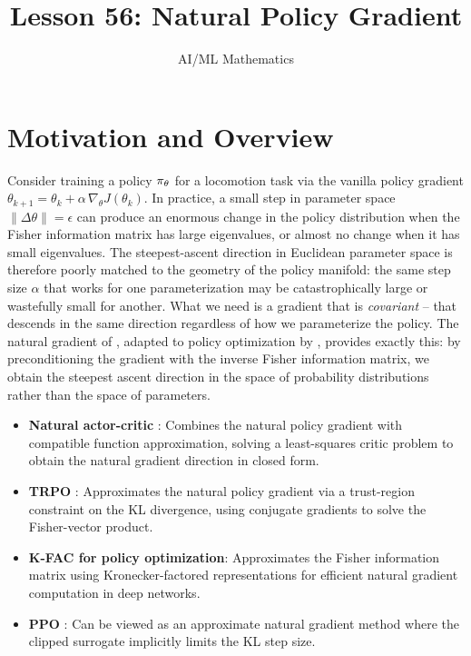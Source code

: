 \documentclass[11pt,a4paper]{article}
\title{Lesson 56: Natural Policy Gradient}
\author{AI/ML Mathematics}
\date{}
\begin{document}
\maketitle
\tableofcontents
\newpage

\section{Motivation and Overview}

Consider training a policy $\pi_\theta$ for a locomotion task via
the vanilla policy gradient $\theta_{k+1} = \theta_k + \alpha\,
\nabla_\theta J(\theta_k)$. In practice, a small step in parameter space
$\|\Delta\theta\| = \epsilon$ can produce an enormous change in the
policy distribution when the Fisher information matrix has large
eigenvalues, or almost no change when it has small eigenvalues. The
steepest-ascent direction in Euclidean parameter space is therefore
poorly matched to the geometry of the policy manifold: the same step
size $\alpha$ that works for one parameterization may be catastrophically
large or wastefully small for another. What we need is a gradient that
is \emph{covariant} -- that descends in the same direction regardless of
how we parameterize the policy. The natural gradient of
\citet{amari1998}, adapted to policy optimization by \citet{kakade2002},
provides exactly this: by preconditioning the gradient with the inverse
Fisher information matrix, we obtain the steepest ascent direction in the
space of probability distributions rather than the space of parameters.

\begin{rlconnection}
\begin{itemize}
  \item \textbf{Natural actor-critic} \citep{peters2008}: Combines the
    natural policy gradient with compatible function approximation,
    solving a least-squares critic problem to obtain the natural gradient
    direction in closed form.
  \item \textbf{TRPO} \citep{schulman2015trpo}: Approximates the natural
    policy gradient via a trust-region constraint on the KL divergence,
    using conjugate gradients to solve the Fisher-vector product.
  \item \textbf{K-FAC for policy optimization}: Approximates the Fisher
    information matrix using Kronecker-factored representations for
    efficient natural gradient computation in deep networks.
  \item \textbf{PPO} \citep{schulman2017}: Can be viewed as an
    approximate natural gradient method where the clipped surrogate
    implicitly limits the KL step size.
\end{itemize}
\end{rlconnection}
\end{document}
